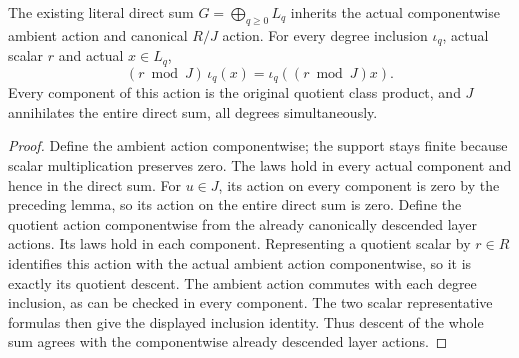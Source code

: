 \begin{lemma}
\label{hir:relative-normal-actual-associated-centre-scalars}
\leanok
The existing literal direct sum $G=\bigoplus_{q\geq0}L_q$ inherits the
actual componentwise ambient action and canonical $R/J$ action.  For
every degree inclusion $\iota_q$, actual scalar $r$ and actual $x\in L_q$,
\[
 (r\bmod J)\,\iota_q(x)=\iota_q((r\bmod J)x).
\]
Every component of this action is the original quotient class product,
and $J$ annihilates the entire direct sum, all degrees simultaneously.
\end{lemma}
\begin{proof}
Define the ambient action componentwise; the support stays finite because
scalar multiplication preserves zero.  The laws hold in every actual
component and hence in the direct sum.  For $u\in J$, its action on every
component is zero by the preceding lemma, so its action on the entire
direct sum is zero.  Define the quotient action componentwise from the already canonically
descended layer actions.  Its laws hold in each component.  Representing
a quotient scalar by $r\in R$ identifies this action with the actual
ambient action componentwise, so it is exactly its quotient descent.
The ambient action commutes with each degree inclusion, as can be
checked in every component.  The two scalar representative formulas
then give the displayed inclusion identity.  Thus descent of the whole sum agrees with the
componentwise already descended layer actions.
\end{proof}

